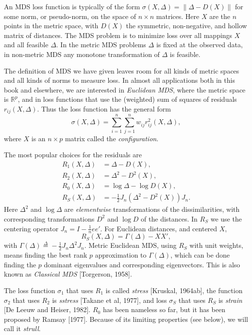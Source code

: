 \documentclass[
  12pt,
]{book}
\begin{document}
An MDS loss function is typically of the form \(\sigma(X,\Delta)=\|\Delta-D(X)\|\)
for some norm, or pseudo-norm, on the space
of \(n\times n\) matrices.
Here \(X\) are the \(n\) points in the metric space,
with \(D(X)\) the symmetric, non-negative, and hollow matrix
of distances. The MDS problem is to minimize loss over all
mappings \(X\) and all feasible \(\Delta\). In the metric
MDS problems \(\Delta\) is fixed at the observed data, in non-metric MDS
any monotone transformation of \(\Delta\) is feasible.

The definition of MDS we have given leaves room for all kinds of metric spaces and all kinds of norms to measure loss. In almost
all applications both in this book and elsewhere, we are
interested in \emph{Euclidean MDS}, where the metric space is \(\mathbb{R}^p\), and in loss functions that use
the (weighted) sum of squares of
residuals \(r_{ij}(X,\Delta)\). Thus the loss function has the general form
\[
\sigma(X,\Delta)=
\sum_{i=1}^n\sum_{j=1}^n w_{ij}^{\ }r_{ij}^2(X,\Delta),
\]
where \(X\) is an \(n\times p\) matrix called the
\emph{configuration}.

The most popular choices for the residuals are
\begin{align*}
R_1(X,\Delta)&=\Delta-D(X),\\
R_2(X,\Delta)&=\Delta^2-D^2(X),\\
R_0(X,\Delta)&=\log\Delta-\log D(X),\\
R_S(X,\Delta)&=-\frac12 J_n(\Delta^2-D^2(X))J_n.
\end{align*}
Here \(\Delta^2\) and \(\log\Delta\) are \emph{elementwise}
transformations of the dissimilarities, with corresponding
transformations \(D^2\) and \(\log D\) of the distances.
In \(R_S\) we use the
centering operator \(J_n=I-\frac{1}{n}ee'\). For Euclidean
distances, and centered \(X\),
\[
R_S(X,\Delta)=\Gamma(\Delta)-XX',
\]
with \(\Gamma(\Delta)\mathop{=}\limits^{\Delta}-\frac12 J_n\Delta^2J_n\). Metric Euclidean MDS, using \(R_S\) with unit weights,
means finding the best rank \(p\) approximation to \(\Gamma(\Delta)\), which can be done finding
the \(p\) dominant eigenvalues and corresponding eigenvectors.
This is also known as \emph{Classical MDS} {[}Torgerson, 1958{]}.

The loss function \(\sigma_1\)
that uses \(R_1\) is called \emph{stress} {[}Kruskal, 1964ab{]},
the function \(\sigma_2\) that
uses \(R_2\) is \emph{sstress} {[}Takane et al, 1977{]}, and
loss \(\sigma_S\) that uses \(R_S\) is \emph{strain}
{[}De Leeuw and Heiser, 1982{]}. \(R_0\) has been nameless so far, but it has been proposed by
Ramsay {[}1977{]}. Because of its limiting properties (see below), we will call it \emph{strull}.
\end{document}
